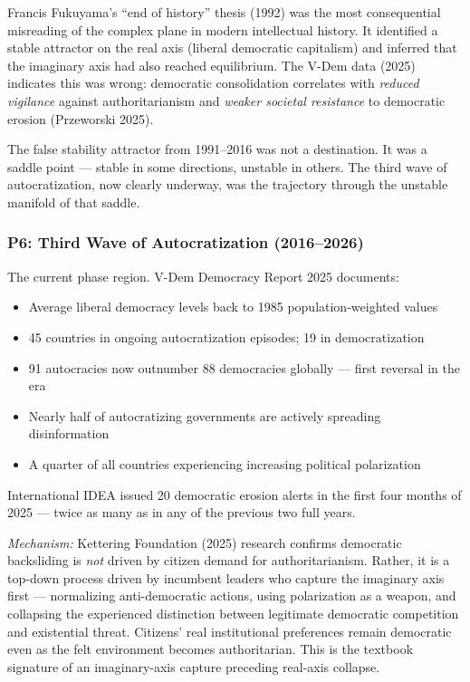 \documentclass[11pt,letterpaper]{article}
\begin{document}
Francis Fukuyama's ``end of history'' thesis (1992) was the most consequential misreading of the complex plane in modern intellectual history. It identified a stable attractor on the real axis (liberal democratic capitalism) and inferred that the imaginary axis had also reached equilibrium. The V-Dem data (2025) indicates this was wrong: democratic consolidation correlates with \textit{reduced vigilance} against authoritarianism and \textit{weaker societal resistance} to democratic erosion (Przeworski 2025).

The false stability attractor from 1991--2016 was not a destination. It was a saddle point --- stable in some directions, unstable in others. The third wave of autocratization, now clearly underway, was the trajectory through the unstable manifold of that saddle.

\subsubsection{P6: Third Wave of Autocratization (2016--2026)}

The current phase region. V-Dem Democracy Report 2025 documents:
\begin{itemize}[noitemsep]
  \item Average liberal democracy levels back to 1985 population-weighted values
  \item 45 countries in ongoing autocratization episodes; 19 in democratization
  \item 91 autocracies now outnumber 88 democracies globally --- first reversal in the era
  \item Nearly half of autocratizing governments are actively spreading disinformation
  \item A quarter of all countries experiencing increasing political polarization
\end{itemize}

International IDEA issued 20 democratic erosion alerts in the first four months of 2025 --- twice as many as in any of the previous two full years.

\textit{Mechanism:} Kettering Foundation (2025) research confirms democratic backsliding is \textit{not} driven by citizen demand for authoritarianism. Rather, it is a top-down process driven by incumbent leaders who capture the imaginary axis first --- normalizing anti-democratic actions, using polarization as a weapon, and collapsing the experienced distinction between legitimate democratic competition and existential threat. Citizens' real institutional preferences remain democratic even as the felt environment becomes authoritarian. This is the textbook signature of an imaginary-axis capture preceding real-axis collapse.
\end{document}
